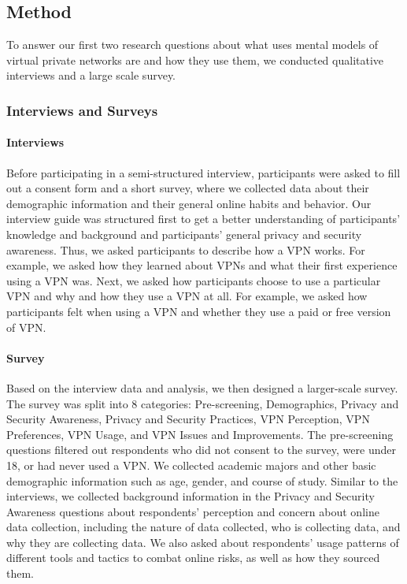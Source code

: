 \subsection{Method}

To answer our first two research questions about  what uses mental models of
virtual private networks are and how they use them,  we conducted
qualitative interviews and a large scale survey. 


\subsubsection{Interviews and Surveys} 

\paragraph{Interviews}
Before participating in a semi-structured interview, participants were asked
to fill out a consent form and a short survey, where we collected data about
their demographic information and their general online habits and behavior.
Our interview guide was structured first to get a better understanding of
participants' knowledge and background and participants' general privacy and
security awareness. Thus, we asked
participants to describe how a VPN works. For example, we asked how they learned about VPNs and what
their first experience using a VPN was. Next, we asked how participants choose
to use a particular VPN and why and how they use a VPN at all. For example, we asked
how participants felt when using a VPN and whether they use a paid or free
version of VPN.  
 
\paragraph{Survey}
Based on the interview data and analysis, we then designed a larger-scale survey.  The survey was split into 8 categories: Pre-screening, Demographics, Privacy and
Security Awareness, Privacy and Security Practices, VPN Perception, VPN
Preferences, VPN Usage, and VPN Issues and Improvements. The pre-screening questions
filtered out respondents who did not consent to the survey, were under 18, or
had never used a VPN. We collected academic
majors and other basic demographic information such as age, gender, and course of study. Similar to the interviews, we collected background information in the Privacy and Security Awareness questions about respondents' perception
and concern about online data collection, including the nature of data
collected, who is collecting data, and why they are collecting data. We also asked about respondents' usage patterns
of different tools and tactics to combat online risks, as well as how they
sourced them.

